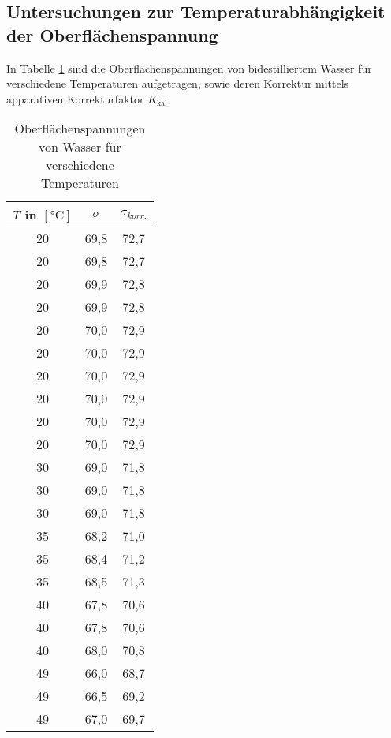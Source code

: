 \subsection*{Untersuchungen zur Temperaturabhängigkeit der Oberflächenspannung}
In Tabelle \ref{tab:temperatur_daten} sind die Oberflächenspannungen von bidestilliertem Wasser für verschiedene Temperaturen aufgetragen, sowie deren Korrektur mittels apparativen Korrekturfaktor $K_{\text{kal}}$.
\vspace*{-4mm}
\begin{table}[h!]
	\renewcommand*{\arraystretch}{1.2}
	\centering
	\caption{Oberflächenspannungen von Wasser für verschiedene Temperaturen}
	\begin{tabular}{c|c|c}
		\hline
		$T$ in $\left[\si{\celsius}\right]$ & $\sigma$& $\sigma_{korr.}$ \\
		\hline
		20    & 69,8  & 72,7 \\
		20    & 69,8  & 72,7 \\
		20    & 69,9  & 72,8 \\
		20    & 69,9  & 72,8 \\
		20    & 70,0    & 72,9 \\
		20    & 70,0    & 72,9 \\
		20    & 70,0    & 72,9 \\
		20    & 70,0    & 72,9 \\
		20    & 70,0    & 72,9 \\
		20    & 70,0    & 72,9 \\
		30    & 69,0    & 71,8 \\
		30    & 69,0    & 71,8 \\
		30    & 69,0    & 71,8 \\
		35    & 68,2  & 71,0 \\
		35    & 68,4  & 71,2 \\
		35    & 68,5  & 71,3 \\
		40    & 67,8  & 70,6 \\
		40    & 67,8  & 70,6 \\
		40    & 68,0    & 70,8 \\
		49    & 66,0    & 68,7 \\
		49    & 66,5  & 69,2 \\
		49    & 67,0    & 69,7 \\
		\hline
	   \end{tabular}%
	\label{tab:temperatur_daten}%
\end{table}%
\FloatBarrier
\vspace*{-2mm}

